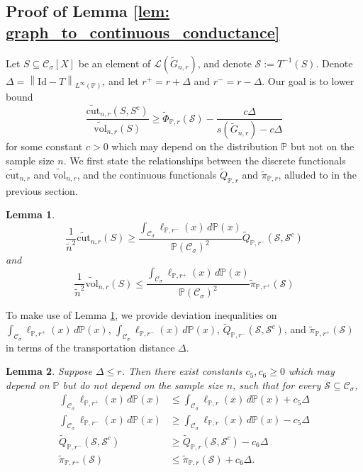 \documentclass[11pt,twoside]{article}
\newtheorem{lemma}{Lemma}
\newcommand{\vol}{\mathrm{vol}}
\newcommand{\cut}{\mathrm{cut}}
\newcommand{\norm}[1]{\left\lVert#1\right\rVert}
\newcommand{\1}{\mathbf{1}}
\newcommand{\Xbf}{X}             %
\newcommand{\Pbb}{\mathbb{P}}
\newcommand{\Sset}{\mathcal{S}}
\newcommand{\Cset}{\mathcal{C}}
\newcommand{\Csig}{\Cset_{\sigma}}
\begin{document}
\subsection{Proof of Lemma \ref{lem: graph_to_continuous_conductance}}
Let $S \subseteq \Csig[\Xbf]$ be an element of $\mathcal{L}(\widetilde{G}_{n,r})$, and denote $\Sset := T^{-1}(S)$. Denote $\varDelta = \norm{\mathrm{Id} - T}_{L^{\infty}(\Pbb)}$, and let $r^{+} = r + \varDelta$ and $r^{-} = r - \varDelta$. Our goal is to lower bound
\begin{equation*}
\frac{\widetilde{\cut}_{n,r}(S,S^c)}{\widetilde{\vol}_{n,r}(S)} \geq \widetilde{\Phi}_{\Pbb,r}(\Sset) - \frac{c \varDelta}{s(\widetilde{G}_{n,r}) - c \varDelta}
\end{equation*}
for some constant $c > 0$ which may depend on the distribution $\Pbb$ but not on the sample size $n$. We first state the relationships between the discrete functionals $\widetilde{\cut}_{n,r}$ and $\widetilde{\vol}_{n,r}$, and the continuous functionals $\widetilde{Q}_{\Pbb,r}$ and $\widetilde{\pi}_{\Pbb,r}$, alluded to in the previous section.
\begin{lemma}
	\label{lem: cut_volume}
	\begin{equation}
	\label{eqn: cut}
	\frac{1}{\widetilde{n}^2}\widetilde{\cut}_{n,r}(S) \geq \frac{\int_{\Csig} \ell_{\Pbb,r^-}(x) \,d\Pbb(x)}{\Pbb(\Csig)^2} \widetilde{Q}_{\Pbb,r^-}(\Sset, \Sset^c)
	\end{equation}
	and 
	\begin{equation}
	\label{eqn: volume}
	\frac{1}{\widetilde{n}^2}\widetilde{\vol}_{n,r}(S) \leq \frac{\int_{\Csig} \ell_{\Pbb,r^+}(x) \,d\Pbb(x)}{\Pbb(\Csig)^2} \widetilde{\pi}_{\Pbb,r^+}(\Sset)
	\end{equation}
\end{lemma}
To make use of Lemma \ref{lem: cut_volume}, we provide deviation inequalities on $\int_{\Csig} \ell_{\Pbb,r^+}(x) \,d\Pbb(x)$, $\int_{\Csig} \ell_{\Pbb,r^-}(x) \,d\Pbb(x)$, $\widetilde{Q}_{\Pbb,r^-}(\Sset, \Sset^c)$, and $\widetilde{\pi}_{\Pbb,r^+}(\Sset)$ in terms of the transportation distance $\varDelta$.
\begin{lemma}
	\label{lem: deviation_transportation_distance}
	Suppose $\Delta \leq r$. Then there exist constants $c_5,c_6 \geq 0$ which may depend on $\Pbb$ but do not depend on the sample size $n$, such that for every $\Sset \subseteq \Csig$,
	\begin{align*}
	\int_{\Csig} \ell_{\Pbb,r^+}(x) \,d\Pbb(x) & \leq \int_{\Csig} \ell_{\Pbb,r}(x) \,d\Pbb(x) + c_5 \varDelta \\
	\int_{\Csig} \ell_{\Pbb,r^-}(x) \,d\Pbb(x) & \geq \int_{\Csig} \ell_{\Pbb,r}(x) \,d\Pbb(x) - c_5 \varDelta \\
	\widetilde{Q}_{\Pbb,r^-}(\Sset, \Sset^c) & \geq \widetilde{Q}_{\Pbb,r}(\Sset, \Sset^c) - c_6 \varDelta \\
	\widetilde{\pi}_{\Pbb,r^+}(\Sset) & \leq \widetilde{\pi}_{\Pbb,r}(\Sset) + c_6 \varDelta.
	\end{align*}
\end{lemma}
\end{document}
